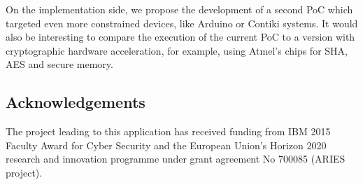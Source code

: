 On the implementation side, we propose the development of a second PoC which targeted even more constrained devices, like Arduino or Contiki systems. 
It would also be interesting to compare the execution of the current PoC to a version with cryptographic hardware acceleration, for example, using Atmel's chips for SHA, AES and secure memory.




\subsection*{Acknowledgements}

The project leading to this application has received funding from IBM 2015 Faculty Award for Cyber Security and the European Union’s Horizon 2020 research and innovation programme under grant agreement No 700085 (ARIES project).
